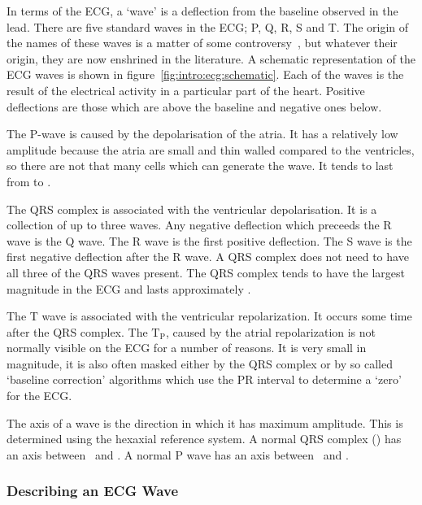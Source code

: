 In terms of the ECG, a `wave' is a deflection from the baseline observed in the
lead.
There are five standard waves in the ECG; P, Q, R, S and T.
The origin of the names of these waves is a matter of some
controversy~\cite{Hurst1998}, but whatever their origin, they are now enshrined
in the literature.
A schematic representation of the ECG waves is shown in
figure~\ref{fig:intro:ecg:schematic}.
Each of the waves is the result of the electrical activity in a particular part
of the heart.
Positive deflections are those which are above the baseline and negative ones
below.

The P-wave is caused by the depolarisation of the atria.
It has a relatively low amplitude because the atria are small and thin walled
compared to the ventricles, so there are not that many cells which can generate
the wave.
It tends to last from  to .

The QRS complex is associated with the ventricular depolarisation.
It is a collection of up to three waves.
Any negative deflection which preceeds the R wave is the Q wave.
The R wave is the first positive deflection.
The S wave is the first negative deflection after the R wave.
A QRS complex does not need to have all three of the QRS waves present.
The QRS complex tends to have the largest magnitude in the ECG and lasts
approximately .

The T wave is associated with the ventricular repolarization.
It occurs some time after the QRS complex.
The $\text{T}_{\text{P}}$, caused by the atrial repolarization is not normally
visible on the ECG for a number of reasons.
It is very small in magnitude, it is also often masked either by the QRS complex
or by so called `baseline correction' algorithms which use the PR interval to
determine a `zero' for the ECG.

The axis of a wave is the direction in which it has maximum amplitude.
This is determined using the hexaxial reference system.
A normal QRS complex (\cite{Lipman1994,Katz2006}) has an axis between \
and .
A normal P wave has an axis between \ and .

\subsubsection{Describing an ECG Wave}

